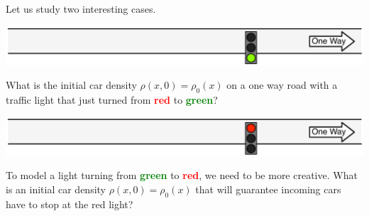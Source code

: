 \documentclass{workbook}
\begin{document}
\begin{slide}
\question

Let us study two interesting cases.

\begin{parts}
\item[]
\begin{center}
\includegraphics[width=.6\textwidth]{images/road-green.pdf}	
\end{center}


\item What is the initial car density $\rho(x,0) = \rho_0(x)$ on a one way road with a traffic light that just turned from \textbf{\textcolor{red}{red}} to \textbf{\textcolor{green}{green}}?


\begin{center}
\includegraphics[width=.6\textwidth]{images/road-red.pdf}	
\end{center}


\item To model a light turning from \textbf{\textcolor{green}{green}} to \textbf{\textcolor{red}{red}}, we need to be more creative. What is an initial car density $\rho(x,0) = \rho_0(x)$ that will guarantee incoming cars have to stop at the red light?

	
\end{parts}
	
\end{slide}
\end{document}
